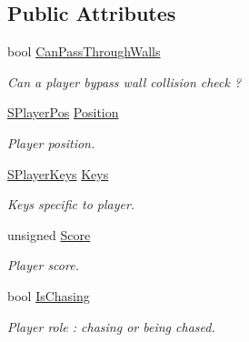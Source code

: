 \subsection*{Public Attributes}
\begin{DoxyCompactItemize}
\item 
\hypertarget{struct_chase_game_1_1_s_player_state_acd7030969c414605901e551171078bb1}{bool \hyperlink{struct_chase_game_1_1_s_player_state_acd7030969c414605901e551171078bb1}{Can\-Pass\-Through\-Walls}}\label{struct_chase_game_1_1_s_player_state_acd7030969c414605901e551171078bb1}

\begin{DoxyCompactList}\small\item\em Can a player bypass wall collision check ? \end{DoxyCompactList}\item 
\hypertarget{struct_chase_game_1_1_s_player_state_a0a68b95a4255f2a543675f88b00847b4}{\hyperlink{struct_chase_game_1_1_s_player_pos}{S\-Player\-Pos} \hyperlink{struct_chase_game_1_1_s_player_state_a0a68b95a4255f2a543675f88b00847b4}{Position}}\label{struct_chase_game_1_1_s_player_state_a0a68b95a4255f2a543675f88b00847b4}

\begin{DoxyCompactList}\small\item\em Player position. \end{DoxyCompactList}\item 
\hypertarget{struct_chase_game_1_1_s_player_state_a3fc9ce0322ed28ff9c401983d91c69f2}{\hyperlink{struct_chase_game_1_1_s_player_keys}{S\-Player\-Keys} \hyperlink{struct_chase_game_1_1_s_player_state_a3fc9ce0322ed28ff9c401983d91c69f2}{Keys}}\label{struct_chase_game_1_1_s_player_state_a3fc9ce0322ed28ff9c401983d91c69f2}

\begin{DoxyCompactList}\small\item\em Keys specific to player. \end{DoxyCompactList}\item 
\hypertarget{struct_chase_game_1_1_s_player_state_a268594c795a70cf1eb9fe6061bfa57d0}{unsigned \hyperlink{struct_chase_game_1_1_s_player_state_a268594c795a70cf1eb9fe6061bfa57d0}{Score}}\label{struct_chase_game_1_1_s_player_state_a268594c795a70cf1eb9fe6061bfa57d0}

\begin{DoxyCompactList}\small\item\em Player score. \end{DoxyCompactList}\item 
\hypertarget{struct_chase_game_1_1_s_player_state_a2574de666d4744daefd7824b1c3c809f}{bool \hyperlink{struct_chase_game_1_1_s_player_state_a2574de666d4744daefd7824b1c3c809f}{Is\-Chasing}}\label{struct_chase_game_1_1_s_player_state_a2574de666d4744daefd7824b1c3c809f}

\begin{DoxyCompactList}\small\item\em Player role \-: chasing or being chased. \end{DoxyCompactList}\end{DoxyCompactItemize}


